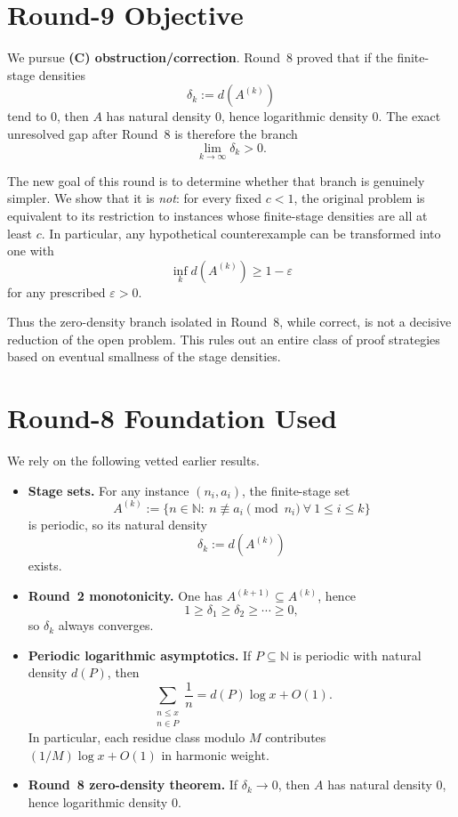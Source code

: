 \section{Round-9 Objective}
We pursue \textbf{(C) obstruction/correction}.  Round~8 proved that if the finite-stage densities
\[
\delta_k:=d(A^{(k)})
\]
tend to $0$, then $A$ has natural density $0$, hence logarithmic density $0$.  The exact unresolved gap after Round~8 is therefore the branch
\[
\lim_{k\to\infty}\delta_k>0.
\]

The new goal of this round is to determine whether that branch is genuinely simpler.  We show that it is \emph{not}: for every fixed $c<1$, the original problem is equivalent to its restriction to instances whose finite-stage densities are all at least $c$.  In particular, any hypothetical counterexample can be transformed into one with
\[
\inf_k d(A^{(k)})\ge 1-\varepsilon
\]
for any prescribed $\varepsilon>0$.

Thus the zero-density branch isolated in Round~8, while correct, is not a decisive reduction of the open problem.  This rules out an entire class of proof strategies based on eventual smallness of the stage densities.

\section{Round-8 Foundation Used}
We rely on the following vetted earlier results.
\begin{itemize}
\item \textbf{Stage sets.}  For any instance $(n_i,a_i)$, the finite-stage set
\[
A^{(k)}:=\{n\in\mathbb N:\ n\not\equiv a_i \pmod{n_i}\ \forall\ 1\le i\le k\}
\]
is periodic, so its natural density
\[
\delta_k:=d(A^{(k)})
\]
exists.
\item \textbf{Round~2 monotonicity.}  One has $A^{(k+1)}\subseteq A^{(k)}$, hence
\[
1\ge \delta_1\ge \delta_2\ge \cdots \ge 0,
\]
so $\delta_k$ always converges.
\item \textbf{Periodic logarithmic asymptotics.}  If $P\subseteq\mathbb N$ is periodic with natural density $d(P)$, then
\[
\sum_{\substack{n\le x\\ n\in P}}\frac1n
=
d(P)\log x+O(1).
\]
In particular, each residue class modulo $M$ contributes $(1/M)\log x+O(1)$ in harmonic weight.
\item \textbf{Round~8 zero-density theorem.}  If $\delta_k\to 0$, then $A$ has natural density $0$, hence logarithmic density $0$.
\end{itemize}

